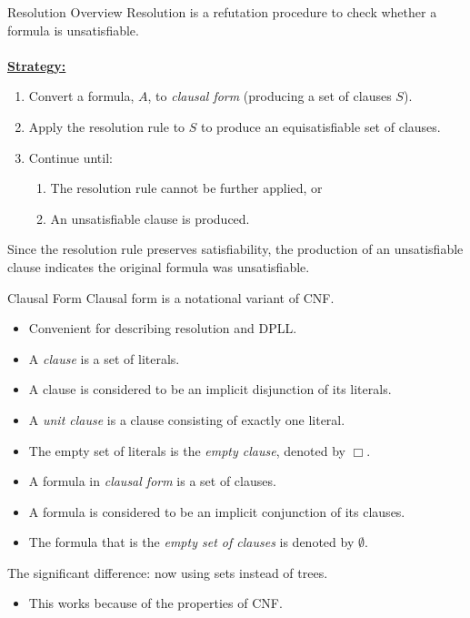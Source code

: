\documentclass[style=sailor,size=12pt]{powerdot}
\theoremstyle{definition}
\newenvironment{defn}[1]
  {\renewcommand\theinnerdefn{#1}\innerdefn}
  {\endinnerdefn}
\begin{document}
\begin{wideslide}[bm=,toc=]{Resolution Overview}
Resolution is a refutation procedure to check whether a formula is
unsatisfiable.\\
~\\
{\bf \underline{Strategy:}}\\
\begin{enumerate}
\item Convert a formula, $A$, to \emph{clausal form} (producing a set of clauses $S$).
\item Apply the resolution rule to $S$ to produce an equisatisfiable set of
clauses.
\item Continue until:
\begin{enumerate}
\item The resolution rule cannot be further applied, or
\item An unsatisfiable clause is produced.
\end{enumerate}
\end{enumerate}
Since the resolution rule preserves satisfiability, the production of an
unsatisfiable clause indicates the original formula was unsatisfiable.
\end{wideslide}

\begin{wideslide}[bm=,toc=]{Clausal Form}
Clausal form is a notational variant of CNF.
\begin{itemize}
\item Convenient for describing resolution and DPLL.
\end{itemize}

\begin{defn}{4.5}[Ben Ari]
\end{defn}
\vspace*{-3ex}
\begin{itemize}
\item A \emph{clause} is a set of literals.  
\item A clause is considered to be an implicit disjunction of its literals.
\item A \emph{unit clause} is a clause consisting of exactly one literal.
\item The empty set of literals is the \emph{empty clause}, denoted by $\Box$.
\item A formula in \emph{clausal form} is a set of clauses.
\item A formula is considered to be an implicit conjunction of its clauses.
\item The formula that is the \emph{empty set of clauses} is denoted by
$\emptyset$.
\end{itemize}

The significant difference: now using sets instead of trees.
\begin{itemize}
\item This works because of the properties of CNF. 
\end{itemize}
\end{wideslide}
\end{document}
